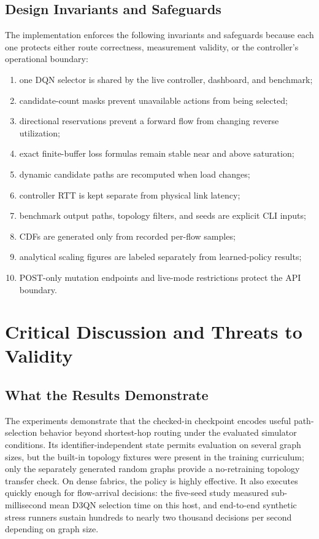 \documentclass[12pt,a4paper,oneside]{report}
\begin{document}
\section{Design Invariants and Safeguards}
The implementation enforces the following invariants and safeguards because each one protects either route correctness, measurement validity, or the controller's operational boundary:
\begin{enumerate}
  \item one DQN selector is shared by the live controller, dashboard, and benchmark;
  \item candidate-count masks prevent unavailable actions from being selected;
  \item directional reservations prevent a forward flow from changing reverse utilization;
  \item exact finite-buffer loss formulas remain stable near and above saturation;
  \item dynamic candidate paths are recomputed when load changes;
  \item controller RTT is kept separate from physical link latency;
  \item benchmark output paths, topology filters, and seeds are explicit CLI inputs;
  \item CDFs are generated only from recorded per-flow samples;
  \item analytical scaling figures are labeled separately from learned-policy results;
  \item POST-only mutation endpoints and live-mode restrictions protect the API boundary.
\end{enumerate}

\chapter{Critical Discussion and Threats to Validity}
\label{chap:discussion}

\section{What the Results Demonstrate}
The experiments demonstrate that the checked-in checkpoint encodes useful path-selection behavior beyond shortest-hop routing under the evaluated simulator conditions. Its identifier-independent state permits evaluation on several graph sizes, but the built-in topology fixtures were present in the training curriculum; only the separately generated random graphs provide a no-retraining topology transfer check. On dense fabrics, the policy is highly effective. It also executes quickly enough for flow-arrival decisions: the five-seed study measured sub-millisecond mean D3QN selection time on this host, and end-to-end synthetic stress runners sustain hundreds to nearly two thousand decisions per second depending on graph size.
\end{document}
